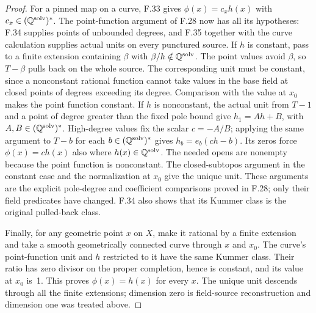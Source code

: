 \begin{proof}
For a pinned map on a curve, F.33 gives
$\phi(x)=c_x h(x)$ with $c_x\in(\mathbb Q^{\mathrm{solv}})^*$.
The point-function argument of F.28 now has all its hypotheses:
F.34 supplies points of unbounded degrees, and F.35 together
with the curve calculation supplies actual units on every
punctured source. If $h$ is constant, pass to a finite extension
containing $\beta$ with $\beta/h\notin\mathbb Q^{\mathrm{solv}}$.
The point values avoid $\beta$, so $T-\beta$ pulls back on
the whole source. The corresponding unit must be constant,
since a nonconstant rational function cannot take values in the
base field at closed points of degrees exceeding its degree.
Comparison with the value at $x_0$ makes the point function
constant. If $h$ is nonconstant, the actual unit from $T-1$
and a point of degree greater than the fixed pole bound give
$h_1=A h+B$, with $A,B\in(\mathbb Q^{\mathrm{solv}})^*$.
High-degree values fix the scalar $c=-A/B$; applying the same
argument to $T-b$ for each $b\in(\mathbb Q^{\mathrm{solv}})^*$ gives
$h_b=e_b(ch-b)$. Its zeros force $\phi(x)=ch(x)$ also where
$h(x)\in\mathbb Q^{\mathrm{solv}}$. The needed opens are nonempty
because the point function is nonconstant. The closed-subtopos
argument in the constant case and the normalization at $x_0$
give the unique unit. These arguments are the explicit
pole-degree and coefficient comparisons proved in F.28;
only their field predicates have changed. F.34 also shows
that its Kummer class is the original pulled-back class.

Finally, for any geometric point $x$ on $X$, make it rational
by a finite extension and take a smooth geometrically connected
curve through $x$ and $x_0$. The curve's point-function unit
and $h$ restricted to it have the same Kummer class. Their
ratio has zero divisor on the proper completion, hence is
constant, and its value at $x_0$ is~1. This proves
$\phi(x)=h(x)$ for every $x$. The unique unit descends through
all the finite extensions; dimension zero is field-source
reconstruction and dimension one was treated above.
\end{proof}

